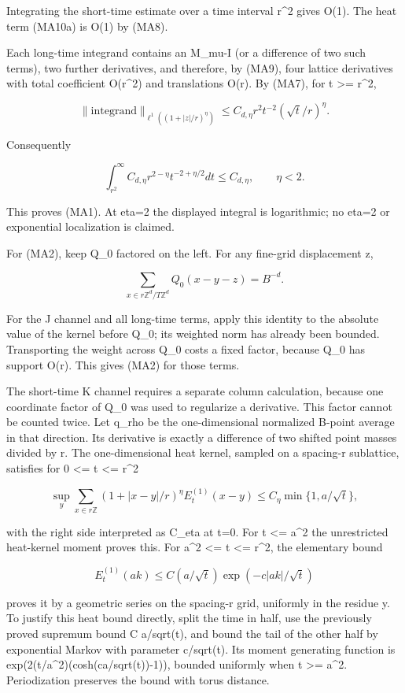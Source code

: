 \documentclass[
  11pt,
]{article}
\begin{document}
Integrating the short-time estimate over a time interval r\^{}2 gives
O(1). The heat term (MA10a) is O(1) by (MA8).

Each long-time integrand contains an M\_mu-I (or a difference of two
such terms), two further derivatives, and therefore, by (MA9), four
lattice derivatives with total coefficient O(r\^{}2) and translations
O(r). By (MA7), for t \textgreater= r\^{}2,

\[
\|\text{integrand}\|_{\ell^1((1+|z|/r)^\eta)}
\le C_{d,\eta}r^2t^{-2}(\sqrt t/r)^\eta.
\]

Consequently

\[
\int_{r^2}^\infty C_{d,\eta}r^{2-\eta}t^{-2+\eta/2}dt
\le C_{d,\eta},\qquad \eta<2.
\]

This proves (MA1). At eta=2 the displayed integral is logarithmic; no
eta=2 or exponential localization is claimed.

For (MA2), keep Q\_0 factored on the left. For any fine-grid
displacement z,

\[
\sum_{x\in r\mathbb Z^d/T\mathbb Z^d}Q_0(x-y-z)=B^{-d}.
\]

For the J channel and all long-time terms, apply this identity to the
absolute value of the kernel before Q\_0; its weighted norm has already
been bounded. Transporting the weight across Q\_0 costs a fixed factor,
because Q\_0 has support O(r). This gives (MA2) for those terms.

The short-time K channel requires a separate column calculation, because
one coordinate factor of Q\_0 was used to regularize a derivative. This
factor cannot be counted twice. Let q\_rho be the one-dimensional
normalized B-point average in that direction. Its derivative is exactly
a difference of two shifted point masses divided by r. The
one-dimensional heat kernel, sampled on a spacing-r sublattice,
satisfies for 0 \textless= t \textless= r\^{}2

\[
\sup_y\sum_{x\in r\mathbb Z}(1+|x-y|/r)^\eta E_t^{(1)}(x-y)
\le C_\eta\min\{1,a/\sqrt t\},
\tag{MA12}
\]

with the right side interpreted as C\_eta at t=0. For t \textless=
a\^{}2 the unrestricted heat-kernel moment proves this. For a\^{}2
\textless= t \textless= r\^{}2, the elementary bound

\[
E_t^{(1)}(ak)\le C(a/\sqrt t)\exp(-c|ak|/\sqrt t)
\]

proves it by a geometric series on the spacing-r grid, uniformly in the
residue y. To justify this heat bound directly, split the time in half,
use the previously proved supremum bound C a/sqrt(t), and bound the tail
of the other half by exponential Markov with parameter c/sqrt(t). Its
moment generating function is exp(2(t/a\^{}2)(cosh(ca/sqrt(t))-1)),
bounded uniformly when t \textgreater= a\^{}2. Periodization preserves
the bound with torus distance.
\end{document}
